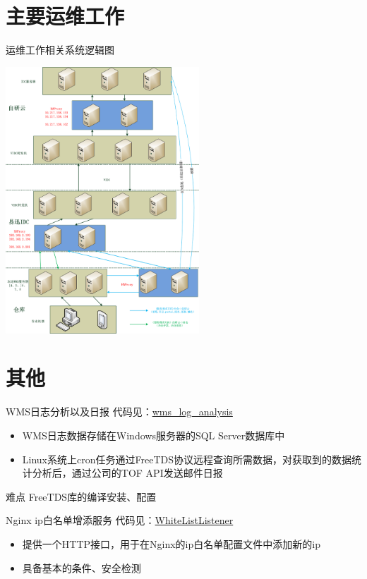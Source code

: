 \documentclass[CJK]{beamer}
\begin{document}
\begin{CJK*}{UTF8}{gbsn}
\section{主要运维工作}
\begin{frame}{运维工作相关系统逻辑图}
\begin{center}
\includegraphics[height=10cm, angle=90]{iWMS.png}
\end{center}
\end{frame}

\section{其他}
\begin{frame}{WMS日志分析以及日报}
代码见：\href{http://10.24.178.60:8000/yongfengxia/wms_log_analysis}{wms\_log\_analysis}
\begin{itemize}
\item WMS日志数据存储在Windows服务器的SQL Server数据库中
\item Linux系统上cron任务通过FreeTDS协议远程查询所需数据，对获取到的数据统计分析后，通过公司的TOF API发送邮件日报
\end{itemize}
\begin{block}{难点}
FreeTDS库的编译安装、配置
\end{block}
\end{frame}

\begin{frame}{Nginx ip白名单增添服务}
代码见：\href{http://10.24.178.60:8000/yongfengxia/whitelistlistener}{WhiteListListener}
\begin{itemize}
\item 提供一个HTTP接口，用于在Nginx的ip白名单配置文件中添加新的ip
\item 具备基本的条件、安全检测
\end{itemize}
\end{frame}


\end{CJK*}
\end{document}
